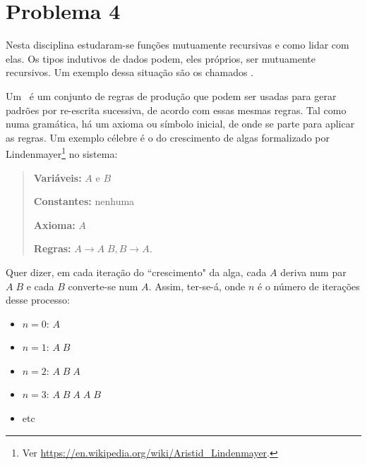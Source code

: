 \documentclass[a4paper]{article}
\newcommand{\Conid}[1]{\mathit{#1}}
\newcommand{\Varid}[1]{\mathit{#1}}
\begin{document}
\section*{Problema 4}
Nesta disciplina estudaram-se funções mutuamente recursivas e como lidar com elas.
Os tipos indutivos de dados podem, eles próprios, ser mutuamente recursivos.
Um exemplo dessa situação são os chamados \LSystems.

Um \LSystem\ é um conjunto de regras de produção que podem ser usadas para
gerar padrões por re-escrita sucessiva, de acordo com essas mesmas regras.
Tal como numa gramática, há um axioma ou símbolo inicial, de onde se parte
para aplicar as regras. Um exemplo célebre é o do crescimento de algas formalizado
por Lindenmayer\footnote{Ver \url{https://en.wikipedia.org/wiki/Aristid_Lindenmayer}.}
no sistema:
\begin{quote}
\textbf{Variáveis:} \ensuremath{\Conid{A}} e \ensuremath{\Conid{B}}

\textbf{Constantes:} nenhuma

\textbf{Axioma:} \ensuremath{\Conid{A}}

\textbf{Regras:} \ensuremath{\Conid{A}\to \Conid{A}\;\Conid{B},\Conid{B}\to \Conid{A}}.
\end{quote}
Quer dizer, em cada iteração do ``crescimento" da alga, cada \ensuremath{\Conid{A}} deriva num par \ensuremath{\Conid{A}\;\Conid{B}} e
cada \ensuremath{\Conid{B}} converte-se num \ensuremath{\Conid{A}}. Assim, ter-se-á, onde \ensuremath{\Varid{n}} é o número de iterações
desse processo:
\begin{itemize}
\item	\ensuremath{\Varid{n}\mathrel{=}\mathrm{0}}: \ensuremath{\Conid{A}}
\item	\ensuremath{\Varid{n}\mathrel{=}\mathrm{1}}: \ensuremath{\Conid{A}\;\Conid{B}}
\item	\ensuremath{\Varid{n}\mathrel{=}\mathrm{2}}: \ensuremath{\Conid{A}\;\Conid{B}\;\Conid{A}}
\item	\ensuremath{\Varid{n}\mathrel{=}\mathrm{3}}: \ensuremath{\Conid{A}\;\Conid{B}\;\Conid{A}\;\Conid{A}\;\Conid{B}}
\item	etc
\end{itemize}
\end{document}
